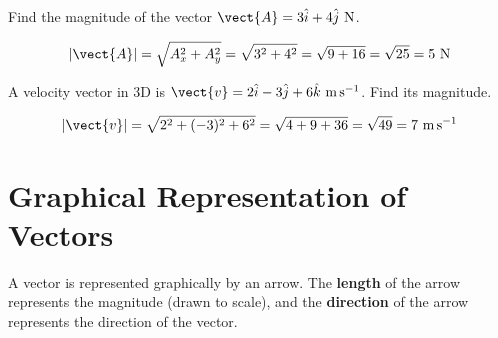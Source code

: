 \begin{examplebox}[2.1]
Find the magnitude of the vector
$\vect{A} = 3\hat{i} + 4\hat{j}\ \text{N}$.
\end{examplebox}

\begin{solutionbox}
\[
  |\vect{A}| = \sqrt{A_x^2 + A_y^2}
  = \sqrt{3^2 + 4^2}
  = \sqrt{9 + 16}
  = \sqrt{25} = 5\ \text{N}
\]
\end{solutionbox}

\begin{examplebox}[2.2]
A velocity vector in 3D is
$\vect{v} = 2\hat{i} - 3\hat{j} + 6\hat{k}\ \text{m\,s}^{-1}$.
Find its magnitude.
\end{examplebox}

\begin{solutionbox}
\[
  |\vect{v}| = \sqrt{2^2 + (-3)^2 + 6^2}
  = \sqrt{4 + 9 + 36}
  = \sqrt{49}
  = 7\ \text{m\,s}^{-1}
\]
\end{solutionbox}

\section{Graphical Representation of Vectors}

A vector is represented graphically by an arrow. The
\textbf{length} of the arrow represents the magnitude
(drawn to scale), and the \textbf{direction} of the arrow
represents the direction of the vector.

\begin{diagbox}
\begin{center}
\end{center}
\end{diagbox}

